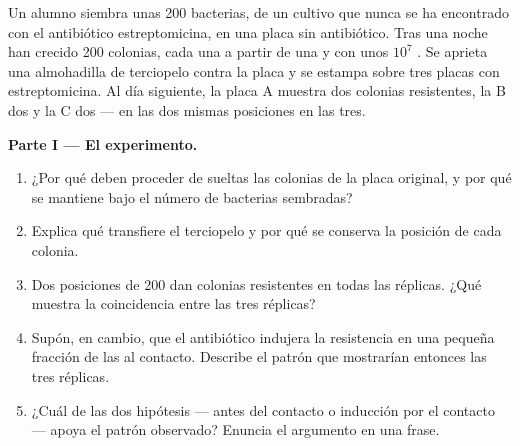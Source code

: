 \begin{problem}
\label{pb:g11:mutations:1}
Un alumno siembra unas 200 bacterias, de un cultivo que nunca se ha
encontrado con el antibiótico estreptomicina, en una placa sin
antibiótico. Tras una noche han crecido 200 colonias, cada una a partir
de una  y con unos $10^7$ . Se aprieta una almohadilla de
terciopelo contra la placa y se estampa sobre tres placas con
estreptomicina. Al día siguiente, la placa A muestra dos colonias
resistentes, la B dos y la C dos --- en las dos mismas posiciones en
las tres.

\medskip
\noindent\textbf{Parte I --- El experimento.}
\begin{enumerate}
  \item ¿Por qué deben proceder de  sueltas las colonias de la
        placa original, y por qué se mantiene bajo el número de
        bacterias sembradas?
  \item Explica qué transfiere el terciopelo y por qué se conserva la
        posición de cada colonia.
  \item Dos posiciones de 200 dan colonias resistentes en todas las
        réplicas. ¿Qué muestra la coincidencia entre las tres réplicas?
  \item Supón, en cambio, que el antibiótico indujera la resistencia en
        una pequeña fracción de las  al contacto. Describe el
        patrón que mostrarían entonces las tres réplicas.
  \item ¿Cuál de las dos hipótesis ---  antes del contacto o
        inducción por el contacto --- apoya el patrón observado? Enuncia
        el argumento en una frase.
\end{enumerate}


\end{problem}
